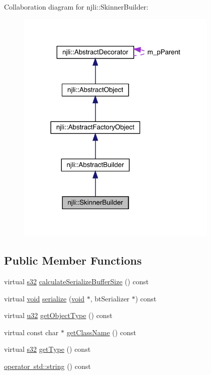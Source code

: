 Collaboration diagram for njli\+:\+:Skinner\+Builder\+:\nopagebreak
\begin{figure}[H]
\begin{center}
\leavevmode
\includegraphics[width=273pt]{classnjli_1_1_skinner_builder__coll__graph}
\end{center}
\end{figure}
\subsection*{Public Member Functions}
\begin{DoxyCompactItemize}
\item 
virtual \mbox{\hyperlink{_util_8h_aa62c75d314a0d1f37f79c4b73b2292e2}{s32}} \mbox{\hyperlink{classnjli_1_1_skinner_builder_adec22b8a23c4223bf42be4e08993a5cb}{calculate\+Serialize\+Buffer\+Size}} () const
\item 
virtual \mbox{\hyperlink{_thread_8h_af1e856da2e658414cb2456cb6f7ebc66}{void}} \mbox{\hyperlink{classnjli_1_1_skinner_builder_a25ac6b4e538b33329b9a54a03eea67c4}{serialize}} (\mbox{\hyperlink{_thread_8h_af1e856da2e658414cb2456cb6f7ebc66}{void}} $\ast$, bt\+Serializer $\ast$) const
\item 
virtual \mbox{\hyperlink{_util_8h_a10e94b422ef0c20dcdec20d31a1f5049}{u32}} \mbox{\hyperlink{classnjli_1_1_skinner_builder_af5a6f6f73b0a7d61b4a558ab76fee5a1}{get\+Object\+Type}} () const
\item 
virtual const char $\ast$ \mbox{\hyperlink{classnjli_1_1_skinner_builder_a9c1161b91b23a079a4a060a7ff679e1b}{get\+Class\+Name}} () const
\item 
virtual \mbox{\hyperlink{_util_8h_aa62c75d314a0d1f37f79c4b73b2292e2}{s32}} \mbox{\hyperlink{classnjli_1_1_skinner_builder_a63933de3879401bd9d2681d7c97b6e5e}{get\+Type}} () const
\item 
\mbox{\hyperlink{classnjli_1_1_skinner_builder_a9aeeac78bae57f6ca91e7edc2fdabd89}{operator std\+::string}} () const
\end{DoxyCompactItemize}
